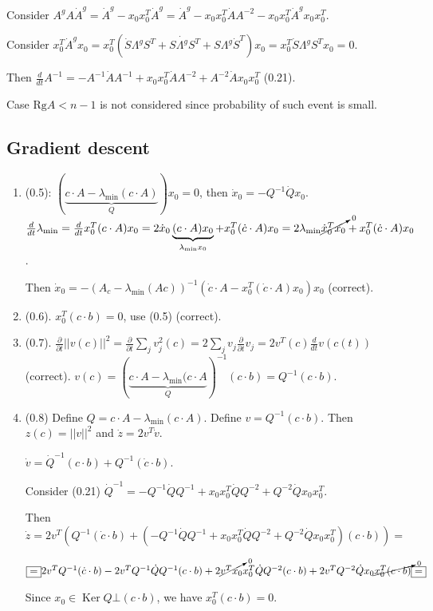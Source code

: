 \documentclass[a4paper]{article}
\DeclareMathOperator{\Ker}{Ker}
\begin{document}
Consider $A^gA\dot{A}^g=\dot{A}^g-x_0x_0^T\dot{A}^g=\dot{A}^g-x_0x_0^T\dot{A}A^{-2}-x_0x_0^T\dot{A}^gx_0x_0^T$.

Consider $x_0^T\dot{A}^gx_0=x_0^T(\dot{S}\Lambda^gS^T+S\dot{\Lambda^g}S^T+S\Lambda^g\dot{S}^T)x_0=x_0^T\dot{S}\Lambda^gS^Tx_0=0$.

Then $\frac{d}{dt}A^{-1}=-A^{-1}\dot{A}A^{-1}+x_0x_0^T\dot{A}A^{-2}+A^{-2}\dot{A}x_0x_0^T$ (0.21).

Case $\mbox{Rg}A<n-1$ is not considered since probability of such event is small.
\subsection{Gradient descent}
\label{gradient}
\begin{enumerate}
\item (0.5): $(\underbrace{c\cdot A-\lambda_{\min}(c\cdot A)}_Q)x_0=0$, then $\dot{x}_0=-Q^{-1}\dot{Q}x_0$. $\frac{d}{dt}\lambda_{\min}=\frac{d}{dt}x_0^T(c\cdot A)x_0=2\dot{x}_0\underbrace{(c\cdot A)x_0}_{\lambda_{\min}x_0}+x_0^T(\dot{c}\cdot A)x_0=2\lambda_{\min}\cancelto{0}{\dot{x}_0^Tx_0}+x_0^T(\dot{c}\cdot A)x_0$.

Then $\dot{x}_0=-(A_c-\lambda_{\min}(Ac))^{-1}(\dot{c}\cdot A-x_0^T(\dot{c}\cdot A)x_0)x_0$ (correct).
\item (0.6). $x_0^T(c\cdot b)=0$, use (0.5) (correct).
\item (0.7). $\frac{\partial}{\partial t}||v(c)||^2=\frac{\partial}{\partial t}\sum\limits_j v_j^2(c)=2\sum\limits_j v_j\frac{\partial}{\partial t}v_j=2v^T(c)\frac{d}{dt} v(c(t))$ (correct). $v(c)=(\underbrace{c\cdot A-\lambda_{\min}(c\cdot A}_Q)^{-1}(c\cdot b)=Q^{-1}(c\cdot b)$.
\item (0.8) Define $Q=c\cdot A-\lambda_{\min}(c\cdot A)$. Define $v=Q^{-1}(c\cdot b)$. Then $z(c)=||v||^2$ and $\dot{z}=2v^T\dot{v}$.

$\dot{v}=\dot{Q}^{-1}(c\cdot b)+Q^{-1}(\dot{c}\cdot b)$.

Consider (0.21) $\dot{Q}^{-1}=-Q^{-1}\dot{Q}Q^{-1}+x_0x_0^T\dot{Q}Q^{-2}+Q^{-2}\dot{Q}x_0x_0^T$.

Then $\dot{z}=2v^T\left(Q^{-1}(\dot{c}\cdot b)+(-Q^{-1}\dot{Q}Q^{-1}+x_0x_0^T\dot{Q}Q^{-2}+Q^{-2}\dot{Q}x_0x_0^T)(c\cdot b)\right)\boxed{=}$

$\boxed{=}2v^TQ^{-1}(\dot{c}\cdot b)-2v^TQ^{-1}\dot{Q}Q^{-1}(c\cdot b)+2\cancelto{0}{v^Tx_0}x_0^T\dot{Q}Q^{-2}(c\cdot b)+2v^TQ^{-2}\dot{Q}x_0\cancelto{0}{x_0^T(c\cdot b)}\boxed{=}$

Since $x_0\in \Ker Q\bot (c\cdot b)$, we have $x_0^T(c\cdot b)=0$.


\end{enumerate}
\end{document}

